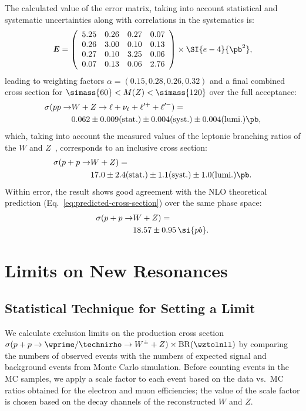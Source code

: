 The calculated value of the error matrix, taking into account statistical and systematic uncertainties along with correlations in the systematics is:
\begin{equation}
 \errmat = \left(
 \begin{array}{cccc}
 5.25  & 0.26  & 0.27 & 0.07  \\
 0.26  & 3.00  & 0.10 & 0.13  \\
 0.27  & 0.10  & 3.25 & 0.06  \\
 0.07  & 0.13  & 0.06 & 2.76  \\
 \end{array}
\right) \times \SI{e-4}{\pb^2},
\end{equation}
leading to weighting factors $\alpha = (0.15, 0.28, 0.26, 0.32)$ and a final combined cross section for $\simass{60} < M(Z) < \simass{120}$ over the full acceptance:
\begin{align}
  \sigma(pp \to &W + Z \to \ell + \nu_\ell + \ell^{\prime +} + \ell^{\prime -}) = \notag\\
  & 0.062 \pm 0.009 (\text{stat.}) \pm 0.004 (\text{syst.}) \pm 0.004 (\text{lumi.}) \pb,
\end{align}
which, taking into account the measured values of the leptonic branching ratios of the $W$ and $Z$~\cite{Nakamura:2010zzi}, corresponds to an inclusive cross section:
\begin{align}
  \sigma(p + p \to &W + Z) = \notag\\
  & 17.0 \pm 2.4 (\text{stat.}) \pm 1.1 (\text{syst.}) \pm 1.0 (\text{lumi.}) \pb.
\end{align}
Within error, the result shows good agreement with the NLO theoretical prediction (Eq.~\ref{eq:predicted-cross-section}) over the same phase space:
\begin{align}
  \sigma(p + p \to &W + Z) = \notag\\
  & 18.57 \pm 0.95\,\si{pb}.
\end{align}

\chapter{Limits on New Resonances}
\label{chapter:limits}

\section{Statistical Technique for Setting a Limit}
\label{sec:limit-technique}

We calculate exclusion limits on the production cross section $\sigma(p + p \to \wprime/\technirho \to W^\pm + Z) \times \text{BR}(\wztolnll)$ by comparing the numbers of observed events with the numbers of expected signal and background events from Monte Carlo simulation.  Before counting events in the MC samples, we apply a scale factor to each event based on the data vs.\ MC ratios obtained for the electron and muon efficiencies; the value of the scale factor is chosen based on the decay channels of the reconstructed $W$ and $Z$.

